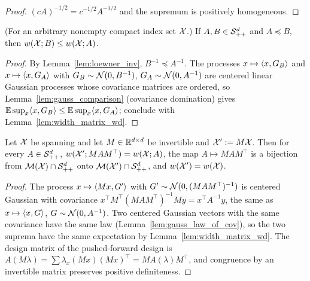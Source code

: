 \begin{proof}
\leanok
{}
$(cA)^{-1/2} = c^{-1/2}A^{-1/2}$ and the supremum is positively homogeneous.
\end{proof}

\begin{lemma}\label{lem:width_mono}
\leanok
{}
(For an arbitrary nonempty compact index set $\mathcal{X}$.) If $A, B \in \mathcal{S}_{++}^{d}$ and $A \preceq B$, then $w(\mathcal{X};B) \le w(\mathcal{X};A)$.
\end{lemma}

\begin{proof}
\leanok
{}
By Lemma~\ref{lem:loewner_inv}, $B^{-1} \preceq A^{-1}$. The processes
$x \mapsto \langle x, G_B \rangle$ and $x\mapsto\langle x, G_A \rangle$ with $G_B\sim\mathcal{N}(0,B^{-1})$,
$G_A \sim \mathcal{N}(0,A^{-1})$ are centered linear Gaussian processes whose covariance matrices
are ordered, so Lemma~\ref{lem:gauss_comparison} (covariance domination) gives
$\mathbb{E}\sup_x\langle x, G_B \rangle \le \mathbb{E}\sup_x\langle x, G_A \rangle$; conclude with Lemma~\ref{lem:width_matrix_wd}.
\end{proof}

\begin{lemma}\label{lem:width_iso}
\leanok
{}
Let $\mathcal{X}$ be spanning and let $M \in \mathbb{R}^{d\times d}$ be invertible and $\mathcal{X}' := M\mathcal{X}$. Then for every $A \in \mathcal{S}_{++}^{d}$,
$w(\mathcal{X}';MAM^\top) = w(\mathcal{X};A)$, the map $A \mapsto MAM^\top$ is a bijection
from $\mathcal{M}(\mathcal{X})\cap\mathcal{S}_{++}^{d}$ onto $\mathcal{M}(\mathcal{X}')\cap\mathcal{S}_{++}^{d}$, and $w(\mathcal{X}') = w(\mathcal{X})$.
\end{lemma}

\begin{proof}
\leanok
{}
The process $x \mapsto \langle Mx, G' \rangle$ with $G' \sim \mathcal{N}(0,(MAM^\top)^{-1})$ is centered
Gaussian with covariance $x^\top M^\top (MAM^\top)^{-1} M y = x^\top A^{-1} y$, the same as
$x \mapsto \langle x, G \rangle$, $G \sim \mathcal{N}(0,A^{-1})$. Two centered Gaussian vectors with the same
covariance have the same law (Lemma~\ref{lem:gauss_law_of_cov}), so the two suprema have the
same expectation by Lemma~\ref{lem:width_matrix_wd}. The design matrix of the pushed-forward
design is $A(M\lambda) = \sum \lambda_x (Mx)(Mx)^\top = MA(\lambda)M^\top$, and congruence by
an invertible matrix preserves positive definiteness.
\end{proof}

